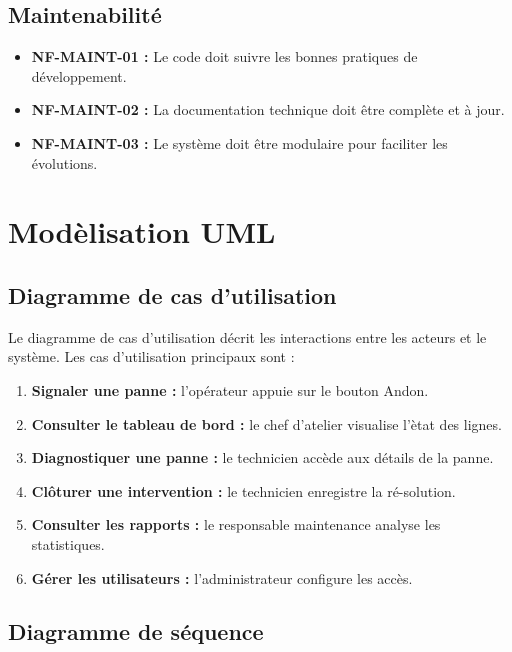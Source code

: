 \subsection{Maintenabilit\'e}

\begin{itemize}
    \item \textbf{NF-MAINT-01 :} Le code doit suivre les bonnes pratiques de d\'eveloppement.
    \item \textbf{NF-MAINT-02 :} La documentation technique doit \^etre compl\`ete et \`a jour.
    \item \textbf{NF-MAINT-03 :} Le syst\`eme doit \^etre modulaire pour faciliter les \'evolutions.
\end{itemize}

\section{Mod\`elisation UML}

\subsection{Diagramme de cas d'utilisation}

Le diagramme de cas d'utilisation d\'ecrit les interactions entre les acteurs et le syst\`eme. Les cas d'utilisation principaux sont :

\begin{enumerate}
    \item \textbf{Signaler une panne :} l'op\'erateur appuie sur le bouton Andon.
    \item \textbf{Consulter le tableau de bord :} le chef d'atelier visualise l'\`etat des lignes.
    \item \textbf{Diagnostiquer une panne :} le technicien acc\`ede aux d\'etails de la panne.
    \item \textbf{Cl\^oturer une intervention :} le technicien enregistre la r\'e-solution.
    \item \textbf{Consulter les rapports :} le responsable maintenance analyse les statistiques.
    \item \textbf{G\'erer les utilisateurs :} l'administrateur configure les acc\`es.
\end{enumerate}

\subsection{Diagramme de s\'equence}

